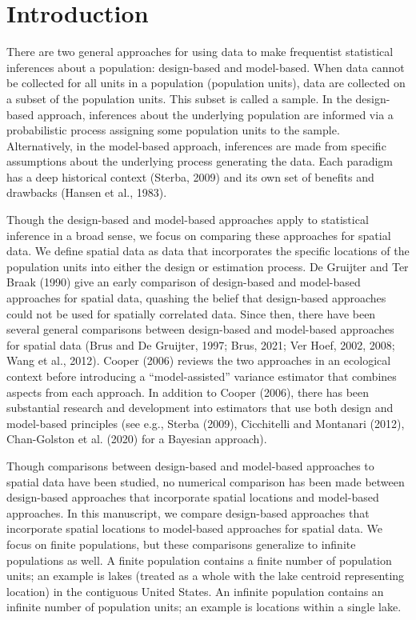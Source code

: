 \documentclass[]{elsarticle} %
\begin{document}
\hypertarget{sec:introduction}{%
\section{Introduction}\label{sec:introduction}}

There are two general approaches for using data to make frequentist
statistical inferences about a population: design-based and model-based.
When data cannot be collected for all units in a population (population
units), data are collected on a subset of the population units. This
subset is called a sample. In the design-based approach, inferences
about the underlying population are informed via a probabilistic process
assigning some population units to the sample. Alternatively, in the
model-based approach, inferences are made from specific assumptions
about the underlying process generating the data. Each paradigm has a
deep historical context (Sterba, 2009) and its own set of benefits and
drawbacks (Hansen et al., 1983).

Though the design-based and model-based approaches apply to statistical
inference in a broad sense, we focus on comparing these approaches for
spatial data. We define spatial data as data that incorporates the
specific locations of the population units into either the design or
estimation process. De Gruijter and Ter Braak (1990) give an early
comparison of design-based and model-based approaches for spatial data,
quashing the belief that design-based approaches could not be used for
spatially correlated data. Since then, there have been several general
comparisons between design-based and model-based approaches for spatial
data (Brus and De Gruijter, 1997; Brus, 2021; Ver Hoef, 2002, 2008; Wang
et al., 2012). Cooper (2006) reviews the two approaches in an ecological
context before introducing a ``model-assisted'' variance estimator that
combines aspects from each approach. In addition to Cooper (2006), there
has been substantial research and development into estimators that use
both design and model-based principles (see e.g., Sterba (2009),
Cicchitelli and Montanari (2012), Chan-Golston et al. (2020) for a
Bayesian approach).

Though comparisons between design-based and model-based approaches to
spatial data have been studied, no numerical comparison has been made
between design-based approaches that incorporate spatial locations and
model-based approaches. In this manuscript, we compare design-based
approaches that incorporate spatial locations to model-based approaches
for spatial data. We focus on finite populations, but these comparisons
generalize to infinite populations as well. A finite population contains
a finite number of population units; an example is lakes (treated as a
whole with the lake centroid representing location) in the contiguous
United States. An infinite population contains an infinite number of
population units; an example is locations within a single lake.
\end{document}
